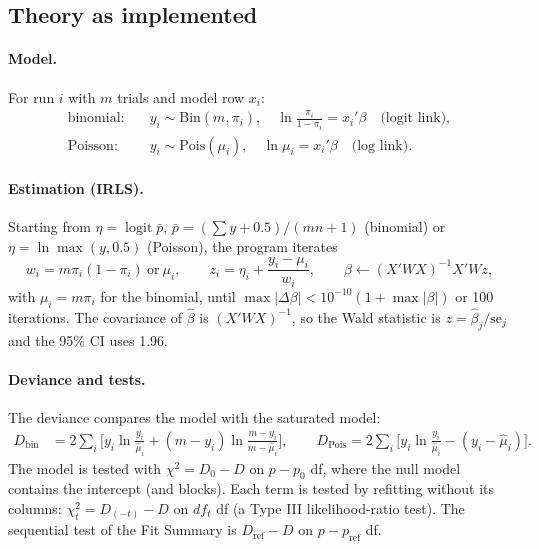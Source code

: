 \subsection*{Theory as implemented}
\paragraph{Model.} For run $i$ with $m$ trials and model row $x_i$:
\begin{align}
  \text{binomial:}\quad & y_i\sim\text{Bin}(m,\pi_i),\quad \ln\frac{\pi_i}{1-\pi_i}=x_i'\beta
  \quad\text{(logit link)}, \label{eq:ch05-logit}\\
  \text{Poisson:}\quad & y_i\sim\text{Pois}(\mu_i),\quad \ln\mu_i=x_i'\beta\quad\text{(log link)}.
  \label{eq:ch05-poisson}
\end{align}

\paragraph{Estimation (IRLS).} Starting from $\eta=\operatorname{logit}\bar p$,
$\bar p=(\sum y+0.5)/(mn+1)$ (binomial) or $\eta=\ln\max(y,0.5)$ (Poisson), the program iterates
\begin{equation}
  w_i=m\pi_i(1-\pi_i)\ \text{or}\ \mu_i,\qquad z_i=\eta_i+\frac{y_i-\mu_i}{w_i},\qquad
  \beta\leftarrow(X'WX)^{-1}X'Wz,
  \label{eq:ch05-irls}
\end{equation}
with $\mu_i=m\pi_i$ for the binomial, until $\max|\Delta\beta|<10^{-10}(1+\max|\beta|)$ or 100 iterations.
The covariance of $\hat\beta$ is $(X'WX)^{-1}$, so the Wald statistic is $z=\hat\beta_j/\text{se}_j$ and the
95\% CI uses 1.96.

\paragraph{Deviance and tests.} The deviance compares the model with the saturated model:
\begin{align}
  D_{\text{bin}}&=2\sum_i\Big[y_i\ln\frac{y_i}{\hat\mu_i}+(m-y_i)\ln\frac{m-y_i}{m-\hat\mu_i}\Big],
  \qquad D_{\text{Pois}}=2\sum_i\Big[y_i\ln\frac{y_i}{\hat\mu_i}-(y_i-\hat\mu_i)\Big]. \label{eq:ch05-dev}
\end{align}
The model is tested with $\chi^2=D_0-D$ on $p-p_0$ df, where the null model contains the intercept (and
blocks). Each term is tested by refitting without its columns: $\chi^2_t=D_{(-t)}-D$ on $df_t$ df (a
Type III likelihood-ratio test). The sequential test of the Fit Summary is $D_{\text{ref}}-D$ on
$p-p_{\text{ref}}$ df.

